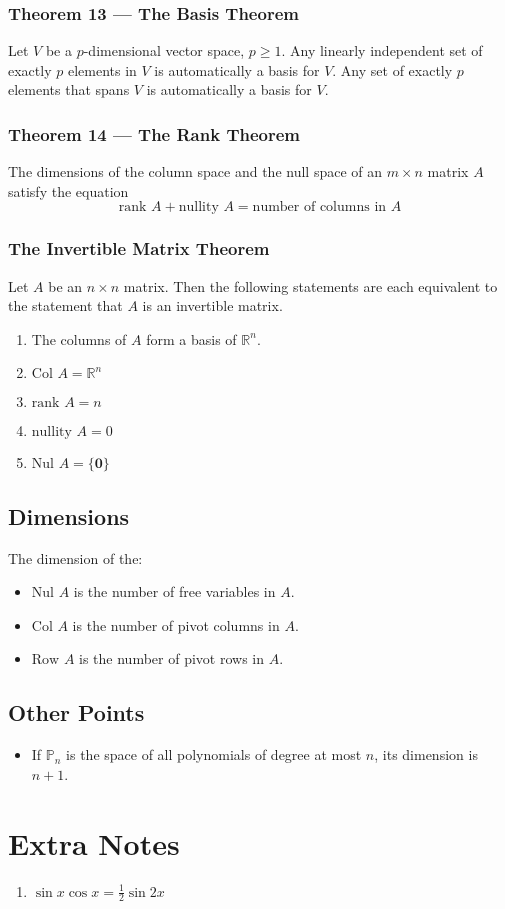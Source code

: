 \documentclass{article}
\begin{document}
\subsubsection*{Theorem 13 --- The Basis Theorem}
Let $V$ be a $p$-dimensional vector space, $p\geq 1$. Any linearly independent set of exactly $p$
elements in $V$ is automatically a basis for $V$. Any set of exactly $p$ elements that spans $V$ is
automatically a basis for $V$.

\subsubsection*{Theorem 14 --- The Rank Theorem}
The dimensions of the column space and the null space of an $m\times n$ matrix $A$ satisfy the
equation
\[\text{rank }A+\text{nullity }A=\text{number of columns in }A\]

\subsubsection*{The Invertible Matrix Theorem}
Let $A$ be an $n\times n$ matrix. Then the following statements are each equivalent to the
statement that $A$ is an invertible matrix.
\begin{enumerate}
    \item The columns of $A$ form a basis of $\mathbb{R}^n$.
    \item $\text{Col }A=\mathbb{R}^n$
    \item $\text{rank }A=n$
    \item $\text{nullity }A=0$
    \item $\text{Nul }A=\{\mathbf{0}\}$
\end{enumerate}

\subsection*{Dimensions}
The dimension of the:
\begin{itemize}
    \item $\text{Nul }A$ is the number of free variables in $A$.
    \item $\text{Col }A$ is the number of pivot columns in $A$.
    \item $\text{Row }A$ is the number of pivot rows in $A$.
\end{itemize}

\subsection*{Other Points}
\begin{itemize}
    \item If $\mathbb{P}_n$ is the space of all polynomials of degree at most $n$, its dimension is
    $n+1$.
\end{itemize}

\section*{Extra Notes}
\begin{enumerate}
    \item $\sin x \cos x = \frac{1}{2} \sin 2x$
\end{enumerate}
\end{document}
